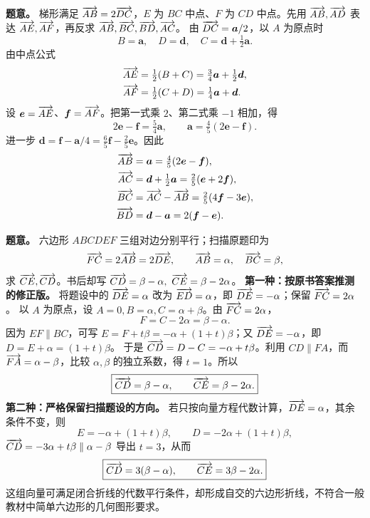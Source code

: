 \textbf{题意。} 梯形满足 $\overrightarrow{AB}=2\overrightarrow{DC}$，$E$ 为 $BC$ 中点、$F$ 为 $CD$ 中点。先用 $\overrightarrow{AB},\overrightarrow{AD}$ 表达 $\overrightarrow{AE},\overrightarrow{AF}$，再反求 $\overrightarrow{AB},\overrightarrow{BC},\overrightarrow{BD},\overrightarrow{AC}$。
由 $\overrightarrow{DC}=\bm a/2$，以 $A$ 为原点时
\[
B=\bm a,\quad D=\bm d,\quad C=\bm d+\tfrac12\bm a.
\]
由中点公式
\begin{align*}
\overrightarrow{AE}&=\tfrac12(B+C)=\tfrac34\bm a+\tfrac12\bm d,\\
\overrightarrow{AF}&=\tfrac12(C+D)=\tfrac14\bm a+\bm d.
\end{align*}
设 $\bm e=\overrightarrow{AE}$、$\bm f=\overrightarrow{AF}$。把第一式乘 $2$、第二式乘 $-1$ 相加，得
\[
2\bm e-\bm f=\tfrac54\bm a,\qquad \bm a=\tfrac45(2\bm e-\bm f).
\]
进一步 $\bm d=\bm f-\bm a/4=\frac65\bm f-\frac25\bm e$。因此
\begin{align*}
\overrightarrow{AB}&=\bm a=\tfrac45(2\bm e-\bm f),\\
\overrightarrow{AC}&=\bm d+\tfrac12\bm a=\tfrac25(\bm e+2\bm f),\\
\overrightarrow{BC}&=\overrightarrow{AC}-\overrightarrow{AB}=\tfrac25(4\bm f-3\bm e),\\
\overrightarrow{BD}&=\bm d-\bm a=2(\bm f-\bm e).
\end{align*}

\textbf{题意。} 六边形 $ABCDEF$ 三组对边分别平行；扫描原题印为
\[
\overrightarrow{FC}=2\overrightarrow{AB}=2\overrightarrow{DE},\qquad\overrightarrow{AB}=\alpha,\quad\overrightarrow{BC}=\beta,
\]
求 $\overrightarrow{CE},\overrightarrow{CD}$。书后却写 $\V{CD}=\beta-\alpha,\ \V{CE}=\beta-2\alpha$。
\textbf{第一种：按原书答案推测的修正版。} 将题设中的 $\overrightarrow{DE}=\alpha$ 改为 $\overrightarrow{ED}=\alpha$，即 $\overrightarrow{DE}=-\alpha$；保留 $\overrightarrow{FC}=2\alpha$。
以 $A$ 为原点，设 $A=0,B=\alpha,C=\alpha+\beta$。由 $\overrightarrow{FC}=2\alpha$，
\[
F=C-2\alpha=\beta-\alpha.
\]
因为 $EF\parallel BC$，可写 $E=F+t\beta= -\alpha+(1+t)\beta$；又 $\overrightarrow{DE}=-\alpha$，即 $D=E+\alpha=(1+t)\beta$。
于是 $\overrightarrow{CD}=D-C=-\alpha+t\beta$。利用 $CD\parallel FA$，而 $\overrightarrow{FA}=\alpha-\beta$，比较 $\alpha,\beta$ 的独立系数，得 $t=1$。所以
\[
\boxed{\overrightarrow{CD}=\beta-\alpha,\qquad \overrightarrow{CE}=\beta-2\alpha.}
\]
\textbf{第二种：严格保留扫描题设的方向。} 若只按向量方程代数计算，$\overrightarrow{DE}=\alpha$，其余条件不变，则
\[
E=-\alpha+(1+t)\beta,\qquad D=-2\alpha+(1+t)\beta,
\]
$\overrightarrow{CD}=-3\alpha+t\beta\parallel\alpha-\beta$ 导出 $t=3$，从而
\[
\boxed{\overrightarrow{CD}=3(\beta-\alpha),\qquad\overrightarrow{CE}=3\beta-2\alpha.}
\]
这组向量可满足闭合折线的代数平行条件，却形成自交的六边形折线，不符合一般教材中简单六边形的几何图形要求。

